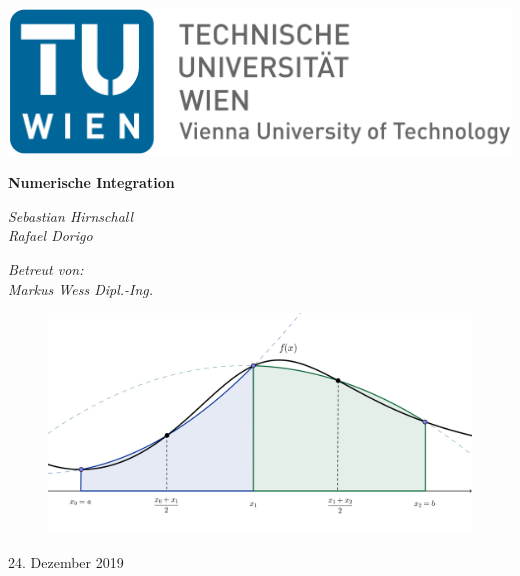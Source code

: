 \documentclass[12pt,a4paper]{scrartcl}
\author{Sebastian Hirnschall, Rafael Dorigo}
\date{\today}
\numberwithin{equation}{section}
\numberwithin{myalgctr}{section}
\numberwithin{mytheoremctr}{subsection}
\numberwithin{mykorollarctr}{subsection}
\numberwithin{mylemmactr}{subsection}
\numberwithin{mybeispielctr}{subsection}
\begin{document}
	\begin{titlepage}
		\begin{flushleft}
				\includegraphics[width=.4\linewidth]{tuwien.png}
		\end{flushleft}	
		\centering
		
		
		\vspace{5cm}
		{\huge\bfseries Numerische Integration\par}
		\vspace{2cm}
		{\Large\itshape Sebastian Hirnschall\\Rafael Dorigo\par}
		\vspace{1cm}
		{\large\itshape Betreut von:\\Markus Wess Dipl.-Ing.\par}
		\vspace{1cm}
		\begin{figure}[!h]
			\vspace{0cm}
			\centering
			\includegraphics[width=.6\linewidth]{./titlepage.png}
		\end{figure}
		
		\vfill
		
		{\large 24. Dezember 2019\par}
	\end{titlepage}
	\restoregeometry
	
	\thispagestyle{firststyle}
	
\end{document}
